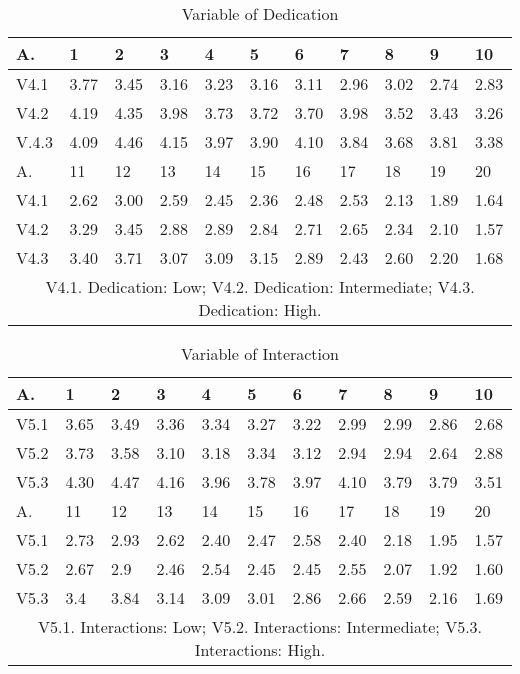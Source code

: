 \documentclass[english]{textolivre}
\begin{document}
\begin{table}[htpb]
\caption{Variable of Dedication}
\label{figure5}
\centering
\begin{tabular}{lllllllllll}
\toprule
A. & 1 & 2 & 3 & 4 & 5 & 6 & 7 & 8 & 9 & 10
\\ 
\midrule
V4.1 & 3.77 & 3.45 & 3.16 & 3.23 & 3.16 & 3.11 & 2.96 & 3.02 & 2.74 & 2.83
\\
V4.2 & 4.19 & 4.35 & 3.98 & 3.73 & 3.72 & 3.70 & 3.98 & 3.52 & 3.43 & 3.26
\\
V.4.3 & 4.09 & 4.46 & 4.15 & 3.97 & 3.90 & 4.10 & 3.84 & 3.68 & 3.81 & 3.38
\\
\midrule
A. & 11 & 12 & 13 & 14 & 15 & 16 & 17 & 18 & 19 & 20
\\
\midrule
V4.1 & 2.62 & 3.00 & 2.59 & 2.45 & 2.36 & 2.48 & 2.53 & 2.13 & 1.89 & 1.64
\\
V4.2 & 3.29 & 3.45 & 2.88 & 2.89 & 2.84 & 2.71 & 2.65 & 2.34 & 2.10 & 1.57
\\
V4.3 & 3.40 & 3.71 & 3.07 & 3.09 & 3.15 & 2.89 & 2.43 & 2.60 & 2.20 & 1.68
\\ 
\midrule
\multicolumn{11}{c}{V4.1. Dedication: Low; V4.2. Dedication: Intermediate; V4.3. Dedication: High.}
\\
\bottomrule
\end{tabular}
\end{table}

\begin{table}[htpb]
\caption{Variable of Interaction}
\label{figure6}
\centering
\begin{tabular}{lllllllllll}
\toprule
A. & 1 & 2 & 3 & 4 & 5 & 6 & 7 & 8 & 9 & 10
\\ 
\midrule
V5.1 & 3.65 & 3.49 & 3.36 & 3.34 & 3.27 & 3.22 & 2.99 & 2.99 & 2.86 & 2.68
\\
V5.2 & 3.73 & 3.58 & 3.10 & 3.18 & 3.34 & 3.12 & 2.94 & 2.94 & 2.64 & 2.88
\\
V5.3 & 4.30 & 4.47 & 4.16 & 3.96 & 3.78 & 3.97 & 4.10 & 3.79 & 3.79 & 3.51
\\
\midrule
A. & 11 & 12 & 13 & 14 & 15 & 16 & 17 & 18 & 19 & 20
\\
\midrule
V5.1 & 2.73 & 2.93 & 2.62 & 2.40 & 2.47 & 2.58 & 2.40 & 2.18 & 1.95 & 1.57
\\
V5.2 & 2.67 & 2.9 & 2.46 & 2.54 & 2.45 & 2.45 & 2.55 & 2.07 & 1.92 & 1.60
\\
V5.3 & 3.4 & 3.84 & 3.14 & 3.09 & 3.01 & 2.86 & 2.66 & 2.59 & 2.16 & 1.69
\\ 
\midrule
\multicolumn{11}{c}{V5.1. Interactions: Low; V5.2. Interactions: Intermediate; V5.3. Interactions: High.}
\\
\bottomrule
\end{tabular}
\end{table}
\end{document}
